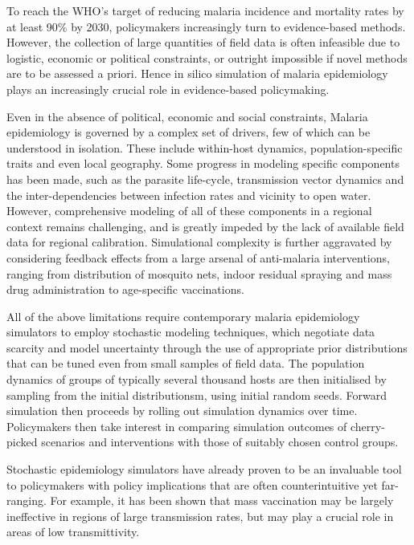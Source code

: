 \documentclass{article}
\begin{document}
To reach the WHO’s target of reducing malaria incidence and mortality rates by at least 90\% by 2030, policymakers increasingly turn to evidence-based methods. However, the collection of large quantities of field data is often infeasible due to logistic, economic or political constraints, or outright impossible if novel methods are to be assessed a priori. Hence in silico simulation of malaria epidemiology plays an increasingly crucial role in evidence-based policymaking.

Even in the absence of political, economic and social constraints, Malaria epidemiology is governed by a complex set of drivers, few of which can be understood in isolation. These include within-host dynamics, population-specific traits and even local geography. Some progress in modeling specific components has been made, such as the parasite life-cycle, transmission vector dynamics and the inter-dependencies between infection rates and vicinity to open water. However, comprehensive modeling of all of these components in a regional context remains challenging, and is greatly impeded by the lack of available field data for regional calibration. Simulational complexity is further aggravated by considering feedback effects from a large arsenal of anti-malaria interventions, ranging from distribution of mosquito nets, indoor residual spraying and mass drug administration to age-specific vaccinations. 

All of the above limitations require contemporary malaria epidemiology simulators to employ stochastic modeling techniques, which negotiate data scarcity and model uncertainty through the use of appropriate prior distributions that can be tuned even from small samples of field data. The population dynamics of groups of typically several thousand hosts are then initialised by sampling from the initial distributionsm, using initial random seeds. Forward simulation then proceeds by rolling out simulation dynamics over time. Policymakers then take interest in comparing simulation outcomes of cherry-picked scenarios and interventions with those of suitably chosen control groups.

Stochastic epidemiology simulators have already proven to be an invaluable tool to policymakers with policy implications that are often counterintuitive yet far-ranging. For example, it has been shown that mass vaccination may be largely ineffective in regions of large transmission rates, but may play a crucial role in areas of low transmittivity. 
\end{document}
